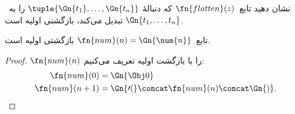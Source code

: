 \documentclass[../../../include/open-logic-section]{subfiles}
\begin{document}
\begin{prob}
نشان دهید تابع~$\fn{flatten}(z)$ که دنبالهٔ
$\tuple{\Gn{t_1},\dots,\Gn{t_n}}$ را به~$\Gn{t_1,\dots,t_n}$ تبدیل
می‌کند، بازگشتی اولیه است.
\end{prob}

\begin{prop}
  تابع~$\fn{num}(n)=\Gn{\num{n}}$ بازگشتی اولیه است.
\end{prop}

\begin{proof}
  $\fn{num}(n)$ را با بازگشت اولیه تعریف می‌کنیم:
  \begin{align*}
    \fn{num}(0) & = \Gn{\Obj 0}\\
    \fn{num}(n+1) & = \Gn{\prime(} \concat \fn{num}(n) \concat \Gn{)}.
  \end{align*}
\end{proof}
\end{document}
